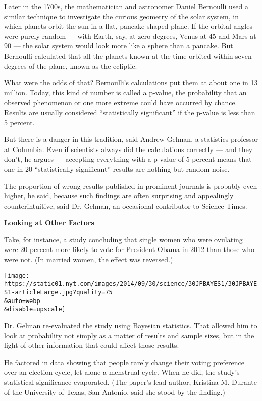 Later in the 1700s, the mathematician and astronomer Daniel Bernoulli
used a similar technique to investigate the curious geometry of the
solar system, in which planets orbit the sun in a flat, pancake-shaped
plane. If the orbital angles were purely random --- with Earth, say, at
zero degrees, Venus at 45 and Mars at 90 --- the solar system would look
more like a sphere than a pancake. But Bernoulli calculated that all the
planets known at the time orbited within seven degrees of the plane,
known as the ecliptic.

What were the odds of that? Bernoulli's calculations put them at about
one in 13 million. Today, this kind of number is called a p-value, the
probability that an observed phenomenon or one more extreme could have
occurred by chance. Results are usually considered ``statistically
significant'' if the p-value is less than 5 percent.

But there is a danger in this tradition, said Andrew Gelman, a
statistics professor at Columbia. Even if scientists always did the
calculations correctly --- and they don't, he argues --- accepting
everything with a p-value of 5 percent means that one in 20
``statistically significant'' results are nothing but random noise.

The proportion of wrong results published in prominent journals is
probably even higher, he said, because such findings are often
surprising and appealingly counterintuitive, said Dr. Gelman, an
occasional contributor to Science Times.

\textbf{Looking at Other Factors}

Take, for instance,
\href{http://pss.sagepub.com/content/early/2013/04/23/0956797612466416.abstract}{a
study} concluding that single women who were ovulating were 20 percent
more likely to vote for President Obama in 2012 than those who were not.
(In married women, the effect was reversed.)

\texttt{[image: https://static01.nyt.com/images/2014/09/30/science/30JPBAYES1/30JPBAYES1-articleLarge.jpg?quality=75\\\&auto=webp\\\&disable=upscale]}

Dr. Gelman re-evaluated the study using Bayesian statistics. That
allowed him to look at probability not simply as a matter of results and
sample sizes, but in the light of other information that could affect
those results.

He factored in data showing that people rarely change their voting
preference over an election cycle, let alone a menstrual cycle. When he
did, the study's statistical significance evaporated. (The paper's lead
author, Kristina M. Durante of the University of Texas, San Antonio,
said she stood by the finding.)

